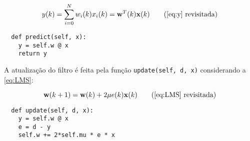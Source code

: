 \begin{equation*}
y(k) = \sum_{i=0}^{N} w_i(k) x_i(k) = {\bf w}^T(k) {\bf x}(k) \tag{\ref{eq:y} revisitada}
\end{equation*}

\begin{verbatim}
  def predict(self, x):
    y = self.w @ x
    return y
\end{verbatim}

A atualização do filtro é feita pela função \texttt{update(self, d, x)} considerando a \cref{eq:LMS}:

\begin{equation*}
{\bf w}(k+1) = {\bf w}(k) + 2 \mu e(k) {\bf x}(k) \tag{\ref{eq:LMS} revisitada}
\end{equation*}

\begin{verbatim}
  def update(self, d, x):
    y = self.w @ x
    e = d - y
    self.w += 2*self.mu * e * x
\end{verbatim}
